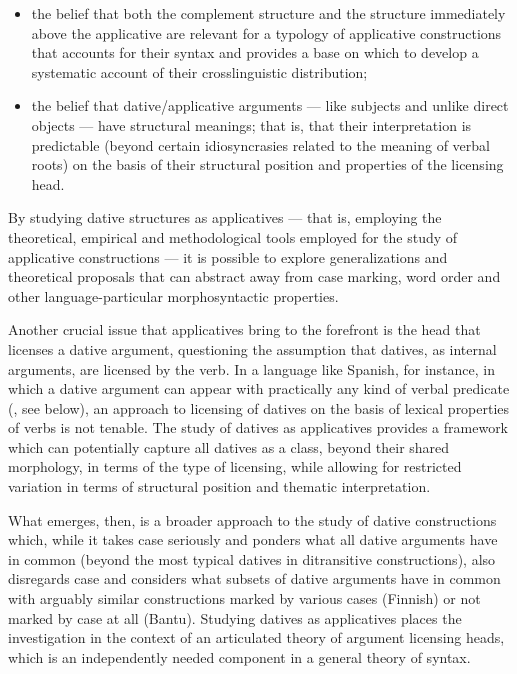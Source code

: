 \documentclass[output=paper,colorlinks,citecolor=brown,modfonts,nonflat]{langsci/langscibook}
\begin{document}
\begin{itemize}
\item \begin{styleListParagraph}
the belief that both the complement structure and the structure immediately above the applicative are relevant for a typology of applicative constructions that accounts for their syntax and provides a base on which to develop a systematic account of their crosslinguistic distribution;
\end{styleListParagraph}
\item \begin{styleListParagraph}
the belief that dative/applicative arguments — like subjects and unlike direct objects — have structural meanings; that is, that their interpretation is predictable (beyond certain idiosyncrasies related to the meaning of verbal roots) on the basis of their structural position and properties of the licensing head.
\end{styleListParagraph}
\end{itemize}

By studying dative structures as applicatives — that is, employing the theoretical, empirical and methodological tools employed for the study of applicative constructions — it is possible to explore generalizations and theoretical proposals that can abstract away from case marking, word order and other language-particular morphosyntactic properties.

Another crucial issue that applicatives bring to the forefront is the head that licenses a dative argument, questioning the assumption that datives, as internal arguments, are licensed by the verb. In a language like Spanish, for instance, in which a dative argument can appear with practically any kind of verbal predicate (\citealt{Cuervo2003}, see  below), an approach to licensing of datives on the basis of lexical properties of verbs is not tenable. The study of datives as applicatives provides a framework which can potentially capture all datives as a class, beyond their shared morphology, in terms of the type of licensing, while allowing for restricted variation in terms of structural position and thematic interpretation.

What emerges, then, is a broader approach to the study of dative constructions which, while it takes case seriously and ponders what all dative arguments have in common (beyond the most typical datives in ditransitive constructions), also disregards case and considers what subsets of dative arguments have in common with arguably similar constructions marked by various cases (Finnish) or not marked by case at all (Bantu).
Studying datives as applicatives places the investigation in the context of an articulated theory of argument licensing heads, which is an independently needed component in a general theory of syntax.
\end{document}
